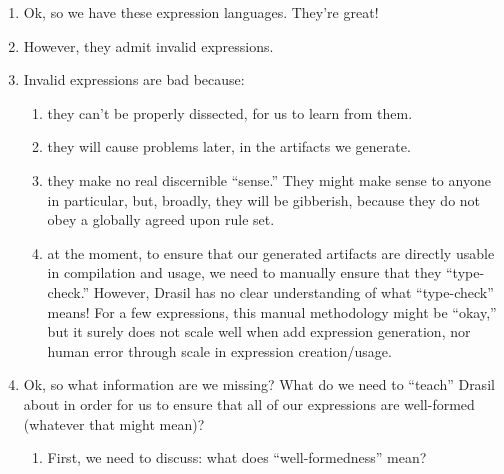 \begin{enumerate}

      \item Ok, so we have these expression languages. They're great!

      \item However, they admit invalid expressions.

      \item Invalid expressions are bad because:

            \begin{enumerate}

                  \item they can't be properly dissected, for us to learn from
                        them.

                  \item they will cause problems later, in the artifacts we
                        generate.

                  \item they make no real discernible ``sense.'' They might make
                        sense to anyone in particular, but, broadly, they will
                        be gibberish, because they do not obey a globally agreed
                        upon rule set.

                  \item at the moment, to ensure that our generated artifacts
                        are directly usable in compilation and usage, we need to
                        manually ensure that they ``type-check.'' However,
                        Drasil has no clear understanding of what ``type-check''
                        means! For a few expressions, this manual methodology
                        might be ``okay,'' but it surely does not scale well
                        when add expression generation, nor human error through
                        scale in expression creation/usage.

            \end{enumerate}

      \item Ok, so what information are we missing? What do we need to ``teach''
            Drasil about in order for us to ensure that all of our expressions
            are well-formed (whatever that might mean)?

            \begin{enumerate}
                  
                  \item First, we need to discuss: what does ``well-formedness''
                        mean? 


\end{enumerate}
\end{enumerate}
